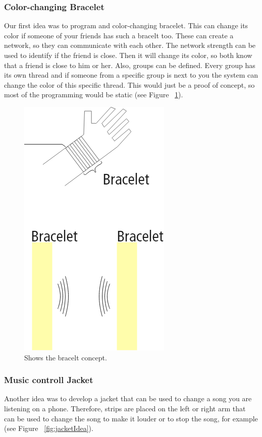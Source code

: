 \documentclass[12pt,twoside,a4paper]{article}
\begin{document}
    \subsubsection{Color-changing Bracelet}
    \begin{flushleft}
        Our first idea was to program and color-changing bracelet. This can change its color if someone of your
        friends has such a bracelt too. These can create a network, so they can communicate with each other. The
        network strength can be used to identify if the friend is close. Then it will change its color, so both know
        that a friend is close to him or her. Also, groups can be defined. Every group has its own thread and if someone 
        from a specific group is next to you the system can change the color of this specific thread. This would just 
        be a proof of concept, so most of the programming would be static (see Figure ~\ref{fig:braceltIdea}).
    \end{flushleft}

    \begin{figure}[h!]
        \centering
        \includegraphics[scale=0.4]{images/projectideas/bracelt.png}
        \caption{Shows the bracelt concept.}
        \label{fig:braceltIdea}
    \end{figure}

    \subsubsection{Music controll Jacket}
    \begin{flushleft}
        Another idea was to develop a jacket that can be used to change a song you are listening on a phone. Therefore,
        strips are placed on the left or right arm that can be used to change the song to make it louder or to stop the song, 
        for example (see Figure ~\ref{fig:jacketIdea}).
    \end{flushleft}
\end{document}
